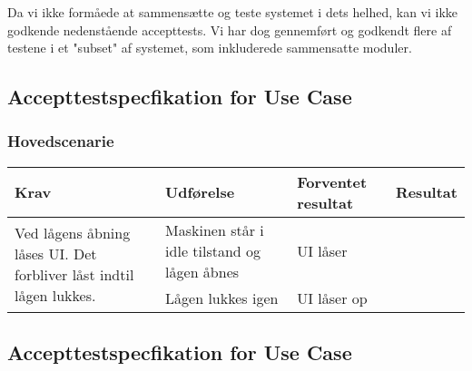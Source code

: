 Da vi ikke formåede at sammensætte og teste systemet i dets helhed, kan vi ikke godkende nedenstående accepttests. Vi har dog gennemført og godkendt flere af testene i et "subset" af systemet, som inkluderede sammensatte moduler.

\subsection{Accepttestspecfikation for Use Case } 

 
 \subsubsection{Hovedscenarie}
\begin{center}

	\begin{tabular}{| p{3cm} | p{3cm} | p{3cm} | p{3cm} |}
		\hline
		Krav & Udførelse & Forventet resultat & Resultat \\ \hline
		
		\multirow{2}{3cm}{Ved lågens åbning låses UI. Det forbliver låst indtil lågen lukkes.} 
		& Maskinen står i idle tilstand og lågen åbnes
		& UI låser
		& \\ \cline{2-4}
		
		&Lågen lukkes igen
		
		&UI låser op
		& \\ \hline 
		

	\end{tabular}
\end{center}


\subsection{Accepttestspecfikation for Use Case } 

